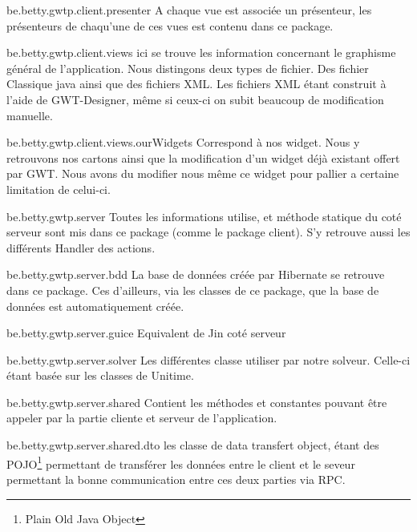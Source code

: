 be.betty.gwtp.client.presenter
A chaque vue est associée un présenteur, les présenteurs de chaqu'une de ces vues est contenu dans ce package.

be.betty.gwtp.client.views
  ici se trouve les information concernant le graphisme général de l'application. Nous distingons deux types de fichier. Des fichier Classique java ainsi que des fichiers XML. Les fichiers XML étant construit à l'aide de GWT-Designer, même si ceux-ci on subit beaucoup de modification manuelle.

be.betty.gwtp.client.views.ourWidgets
Correspond à nos widget. Nous y retrouvons nos cartons ainsi que la modification d'un widget déjà existant offert par GWT. Nous avons du modifier nous même ce widget pour pallier a certaine limitation de celui-ci.

be.betty.gwtp.server
 Toutes les informations utilise, et méthode statique du coté serveur sont mis dans ce package (comme le package client). S'y retrouve aussi les différents Handler des actions.

be.betty.gwtp.server.bdd
 La base de données créée par Hibernate se retrouve dans ce package. Ces d'ailleurs, via les classes de ce package, que la base de données est automatiquement créée.

be.betty.gwtp.server.guice
Equivalent de Jin coté serveur

be.betty.gwtp.server.solver
Les différentes classe utiliser par notre solveur. Celle-ci étant basée sur les classes de Unitime.

be.betty.gwtp.server.shared
Contient les méthodes et constantes pouvant être appeler par la partie cliente et serveur de l'application.

be.betty.gwtp.server.shared.dto
les classe de data transfert object, étant des POJO\footnote{Plain Old Java Object} permettant de transférer les données entre le client et le seveur permettant la bonne communication entre ces deux parties via RPC.